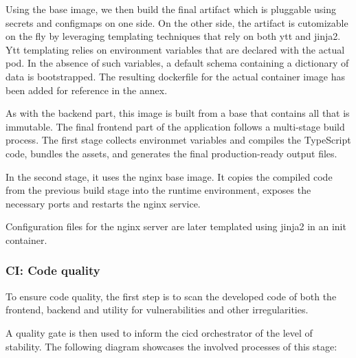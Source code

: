 Using the base image, we then build the final artifact which is pluggable using secrets and configmaps on one side. On the other side, the artifact is cutomizable on the fly by leveraging templating techniques that rely on both ytt and jinja2. Ytt templating relies on environment variables that are declared with the actual pod. In the absence of such variables, a default schema containing a dictionary of data is bootstrapped.
The resulting dockerfile for the actual container image has been added for reference in the annex. 


As with the backend part, this image is built from a base that contains all that is immutable. The final frontend part of the application follows a multi-stage build process. The first stage collects environmet variables and compiles the TypeScript code, bundles the assets, and generates the final production-ready output files.

In the second stage, it uses the nginx base image. It copies the compiled code from the previous build stage into the runtime environment, exposes the necessary ports and restarts the nginx service.

Configuration files for the nginx server are later templated using jinja2 in an init container.

\newpage

\subsubsection{CI: Code quality }

To ensure code quality, the first step is to scan the developed code of both the frontend, backend and utility for vulnerabilities and other irregularities.  

A quality gate is then used to inform the cicd orchestrator of the level of stability. The following diagram showcases the involved processes of this stage: 

